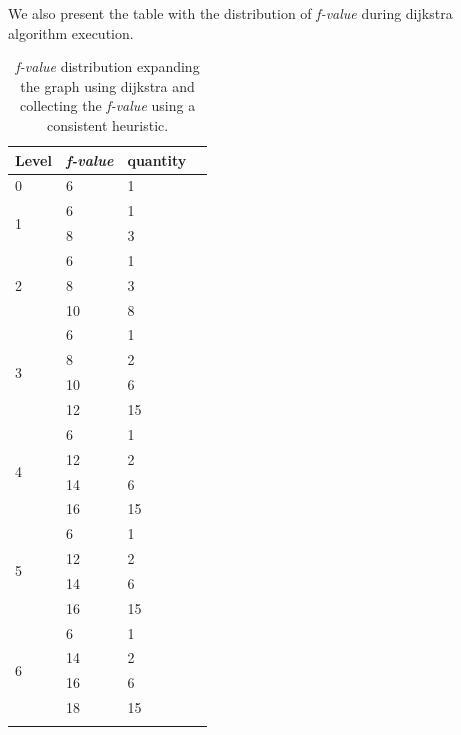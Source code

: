\documentclass[11pt,a4paper,oneside]{report}
\begin{document}
We also present the table with the distribution of \textit{f-value} during dijkstra algorithm execution.
\footnotesize  %
\setlength\LTleft{100pt}            %
\setlength\LTright{200pt}           %
\begin{longtable}{@{\extracolsep{\fill}} llll @{}} %
\hline
Level              & \textit{f-value} & quantity \\ \hline
0                  & 6       & 1        \\ \hline
\multirow{2}{*}{1} & 6       & 1        \\ \cline{2-3} 
                   & 8       & 3        \\ \hline
\multirow{3}{*}{2} & 6       & 1        \\ \cline{2-3} 
                   & 8       & 3        \\ \cline{2-3} 
                   & 10      & 8        \\ \hline
\multirow{4}{*}{3} & 6       & 1        \\ \cline{2-3} 
                   & 8       & 2        \\ \cline{2-3} 
                   & 10      & 6        \\ \cline{2-3} 
                   & 12      & 15       \\ \hline
\multirow{4}{*}{4} & 6       & 1        \\ \cline{2-3} 
                   & 12      & 2        \\ \cline{2-3} 
                   & 14      & 6        \\ \cline{2-3} 
                   & 16      & 15       \\ \hline
\multirow{4}{*}{5} & 6       & 1        \\ \cline{2-3} 
                   & 12      & 2        \\ \cline{2-3} 
                   & 14      & 6        \\ \cline{2-3} 
                   & 16      & 15       \\ \hline
\multirow{4}{*}{6} & 6       & 1        \\ \cline{2-3} 
                   & 14      & 2        \\ \cline{2-3} 
                   & 16      & 6        \\ \cline{2-3} 
                   & 18      & 15       \\ \hline
\caption{\textit{f-value} distribution expanding the graph using dijkstra and collecting the \textit{f-value} using a consistent heuristic.}
\label{table:tabledijkstra}
\end{longtable}
\end{document}
